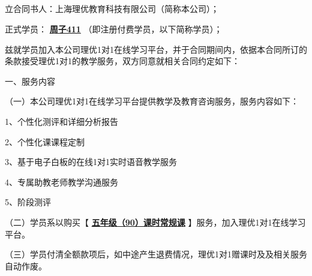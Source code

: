 \documentclass {ctexart}
\begin{document}
\setlength{\parskip}{0.7ex plus0.3ex minus0.3ex} %

\setcounter{page}{1} %
\headheight 14pt %


\pagestyle{fancy}

\fancyhf{}
\renewcommand{\headrulewidth}{0pt}
\fancyhead[LE,RO]{ \usebox{\headpic}   }      %




\subsection{}

立合同书人：上海理优教育科技有限公司（简称本公司）；


正式学员：   \underline{\textbf{周子411}} （即注册付费学员，以下简称学员）；



兹就学员加入本公司理优1对1在线学习平台，并于合同期间内，依据本合同所订的条款接受理优1对1的教学服务，双方同意就相关合同约定如下：


一、服务内容


（一）本公司理优1对1在线学习平台提供教学及教育咨询服务，服务内容如下：


1、个性化测评和详细分析报告	


2、个性化课课程定制


3、基于电子白板的在线1对1实时语音教学服务	


4、专属助教老师教学沟通服务


5、阶段测评


（二）学员系以购买【  \underline{\textbf{ 五年级（90）课时常规课}} 】服务，加入理优1对1在线学习平台。


（三）学员付清全额款项后，如中途产生退费情况，理优1对1赠课时及及相关服务自动作废。
\end{document}
